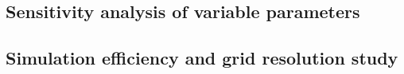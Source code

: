 \documentclass{IEEEtran} %
\begin{document}
\begin{comment}
  \begin{figure}
  \texttt{[image: fig/temp29.png]}
  \caption{For a tree with 12 inch radius, temperature distribution in the north and south aspects, with depth of about 7 inches.} 
  \label{fig:at29}
\end{figure}
\end{comment}



\begin{comment}\begin{figure}
  \texttt{[image: fig/temp2.png]}
  \caption{For a tree with 12 inch radius, temperature distribution in the north and south aspects, near tree center.} 
  \label{fig:at2}
\end{figure}
\end{comment}

\subsection{Sensitivity analysis of variable parameters}

\subsection{Simulation efficiency and grid resolution study}
\end{document}
